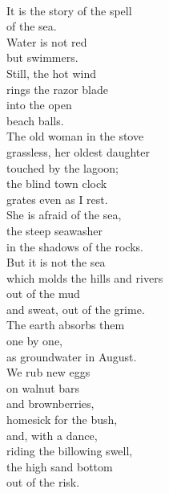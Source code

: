 \documentclass[smalldemyvopaper,11pt,twoside,onecolumn,openright,extrafontsizes]{memoir}
\begin{document}
\\It is the story of the spell
\\of the sea.
\\Water is not red
\\but swimmers.
\\Still, the hot wind
\\rings the razor blade
\\into the open
\\beach balls.
\\The old woman in the stove
\\grassless, her oldest daughter
\\touched by the lagoon;
\\the blind town clock
\\grates even as I rest.
\\She is afraid of the sea,
\\the steep seawasher
\\in the shadows of the rocks.
\\But it is not the sea
\\which molds the hills and rivers
\\out of the mud
\\and sweat, out of the grime.
\\The earth absorbs them
\\one by one,
\\as groundwater in August.
\\We rub new eggs
\\on walnut bars
\\and brownberries,
\\homesick for the bush,
\\and, with a dance,
\\riding the billowing swell,
\\the high sand bottom
\\out of the risk.
\end{document}
